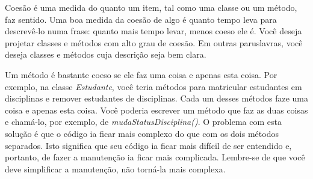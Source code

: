 \documentclass[
	11pt,				%
	openright,
	twoside,			%
	a4paper,			%
	english,			%
	french,
	brazil,				%
	sumario=tradicional
	]{abntex2}
\begin{document}
Coesão é uma medida do quanto um item, tal como uma classe ou um método, faz sentido. Uma boa medida da coesão de algo é quanto tempo leva para descrevê-lo numa frase: quanto mais tempo levar, menos coeso ele é. Você deseja projetar classes e métodos com alto grau de coesão. Em outras paruslavras, você deseja classes e métodos cuja descrição seja bem clara.

Um método é bastante coeso se ele faz uma coisa e apenas esta coisa. Por exemplo, na classe \emph{Estudante}, você teria métodos para matricular estudantes em disciplinas e remover estudantes de disciplinas. Cada um desses métodos faze uma coisa e apenas esta coisa. Você poderia escrever um método que faz as duas coisas e chamá-lo, por exemplo, de \emph{mudaStatusDisciplina()}. O problema com esta solução é que o código ia ficar mais complexo do que com os dois métodos separados. Isto significa que seu código ia ficar mais difícil de ser entendido e, portanto, de fazer a manutenção ia ficar mais complicada. Lembre-se de que você deve simplificar a manutenção, não torná-la mais complexa.

\noindent {}
\end{document}
